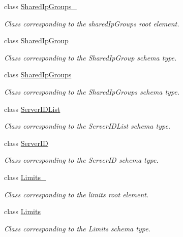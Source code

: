 \begin{DoxyCompactItemize}
class \hyperlink{classopenstack_1_1xml_1_1SharedIpGroups__}{SharedIpGroups\_\-}
\begin{DoxyCompactList}\small\item\em Class corresponding to the sharedIpGroups root element. \item\end{DoxyCompactList}\item 
class \hyperlink{classopenstack_1_1xml_1_1SharedIpGroup}{SharedIpGroup}
\begin{DoxyCompactList}\small\item\em Class corresponding to the SharedIpGroup schema type. \item\end{DoxyCompactList}\item 
class \hyperlink{classopenstack_1_1xml_1_1SharedIpGroups}{SharedIpGroups}
\begin{DoxyCompactList}\small\item\em Class corresponding to the SharedIpGroups schema type. \item\end{DoxyCompactList}\item 
class \hyperlink{classopenstack_1_1xml_1_1ServerIDList}{ServerIDList}
\begin{DoxyCompactList}\small\item\em Class corresponding to the ServerIDList schema type. \item\end{DoxyCompactList}\item 
class \hyperlink{classopenstack_1_1xml_1_1ServerID}{ServerID}
\begin{DoxyCompactList}\small\item\em Class corresponding to the ServerID schema type. \item\end{DoxyCompactList}\item 
class \hyperlink{classopenstack_1_1xml_1_1Limits__}{Limits\_\-}
\begin{DoxyCompactList}\small\item\em Class corresponding to the limits root element. \item\end{DoxyCompactList}\item 
class \hyperlink{classopenstack_1_1xml_1_1Limits}{Limits}
\begin{DoxyCompactList}\small\item\em Class corresponding to the Limits schema type. \item\end{DoxyCompactList}\item 

\end{DoxyCompactItemize}
